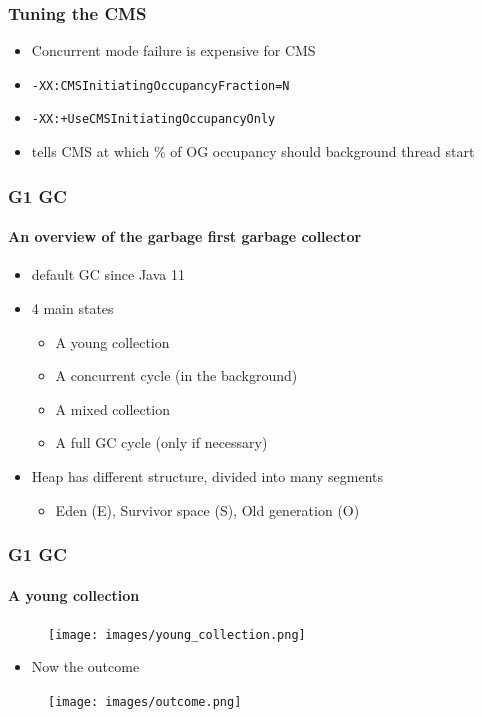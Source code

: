 \documentclass{beamer}
\begin{document}
\begin{frame}
    \frametitle{Tuning the CMS}
    \begin{itemize}
        \item Concurrent mode failure is expensive for CMS
        \item \texttt{-XX:CMSInitiatingOccupancyFraction=N}
        \item \texttt{-XX:+UseCMSInitiatingOccupancyOnly}
        \item tells CMS at which \% of OG occupancy should background thread start
    \end{itemize}
\end{frame}

\begin{frame}
    \frametitle{G1 GC}
    \framesubtitle{An overview of the garbage first garbage collector}
    \begin{itemize}
        \item default GC since Java 11\cite{noauthor_jdk11usrchotspotsharegcg1_nodate}
        \item 4 main states 
        \begin{itemize}
            \item A young collection
            \item A concurrent cycle (in the background)
            \item A mixed collection
            \item A full GC cycle (only if necessary)
        \end{itemize}
        \item Heap has different structure, divided into many segments
        \begin{itemize}
            \item Eden (E), Survivor space (S), Old generation (O)
        \end{itemize}
    \end{itemize}
    
\end{frame}

\begin{frame}
    \frametitle{G1 GC}
    \framesubtitle{A young collection}
    \begin{figure}
        \texttt{[image: images/young\_collection.png]}
    
    \end{figure}
    \begin{itemize}
        \item Now the outcome
    \end{itemize}
    \begin{figure}
        \texttt{[image: images/outcome.png]}
    
    \end{figure}
    
        
    
\end{frame}
\end{document}
